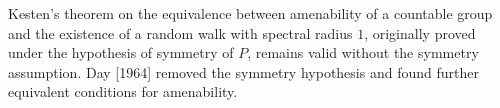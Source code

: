 Kesten's theorem on the equivalence between amenability of a countable group and the existence of a random walk with spectral radius $1$, originally proved under the hypothesis of symmetry of $P$, remains valid without the symmetry assumption. Day [1964] removed the symmetry hypothesis and found further equivalent conditions for amenability.
